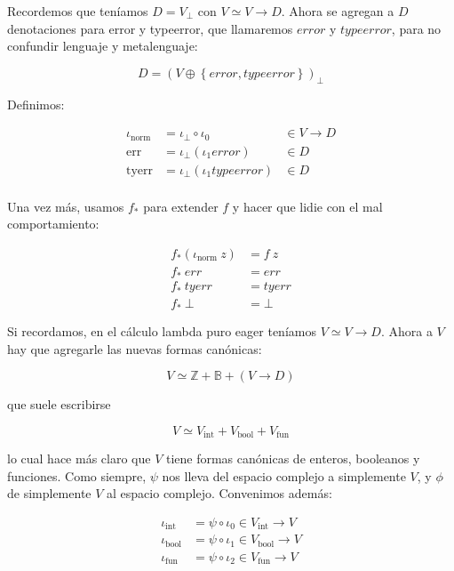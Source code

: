\documentclass[article, 12pt]{article}
\begin{document}
Recordemos que teníamos $D = V_\bot $ con $V \simeq V \to  D$. Ahora se agregan
a $D$ denotaciones para error y typeerror, que llamaremos $error$ y $typeerror$,
para no confundir lenguaje y metalenguaje:

\begin{equation*}
  D = (V \oplus \left\{ error, typeerror \right\} )_\bot 
\end{equation*}

Definimos:

\begin{align*}
  \iota_\text{norm} &= \iota_\bot  \circ \iota_0 &\in V \to D \\
  \text{err} &= \iota_\bot  ( \iota_1 error ) &\in D \\
  \text{tyerr} &= \iota_\bot  ( \iota_1 typeerror ) &\in D \\
\end{align*}

Una vez más, usamos $f_*$ para extender $f$ y hacer que lidie con el mal
comportamiento:

\begin{align*}
  f_*(\iota_{\text{norm}} ~ z) &= f ~ z\\
  f_*~ err &= err \\ 
  f_* ~tyerr &= tyerr \\ 
  f_* ~ \bot &= \bot 
\end{align*}

Si recordamos, en el cálculo lambda puro eager teníamos $V \simeq V \to D$.
Ahora a $V$ hay que agregarle las nuevas formas canónicas: 

\begin{equation*}
  V \simeq \mathbb{Z} + \mathbb{B} + (V \to D)
\end{equation*}

que suele escribirse 

\begin{equation*}
  V \simeq V_{\text{int}} + V_{\text{bool}} + V_{\text{fun}}
\end{equation*}

lo cual hace más claro que $V$ tiene formas canónicas de enteros, booleanos y
funciones. Como siempre, $\psi$ nos lleva del espacio complejo a simplemente
$V$, y $\phi$ de simplemente $V$ al espacio complejo. Convenimos además:

\begin{align*}
  \iota_{\text{int}} &= \psi \circ \iota_0 \in V_{\text{int}} \to V\\
  \iota_{\text{bool}} &= \psi \circ \iota_1 \in V_{\text{bool}} \to V\\
  \iota_{\text{fun}} &= \psi \circ \iota_2 \in V_{\text{fun}} \to V\\
\end{align*}
\end{document}
